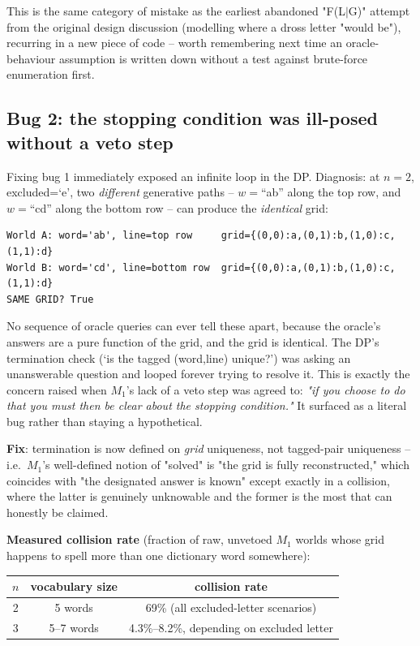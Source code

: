\documentclass[11pt]{article}
\begin{document}
This is the same category of mistake as the earliest abandoned "F(L$\mid$G)"
attempt from the original design discussion (modelling where a dross
letter "would be"), recurring in a new piece of code -- worth remembering
next time an oracle-behaviour assumption is written down without a test
against brute-force enumeration first.

\subsection{Bug 2: the stopping condition was ill-posed without a veto step}

Fixing bug 1 immediately exposed an infinite loop in the DP. Diagnosis: at
$n=2$, excluded=`e', two \emph{different} generative paths --
$w=$``ab'' along the top row, and $w=$``cd'' along the bottom row -- can
produce the \emph{identical} grid:
\begin{lstlisting}
World A: word='ab', line=top row     grid={(0,0):a,(0,1):b,(1,0):c,(1,1):d}
World B: word='cd', line=bottom row  grid={(0,0):a,(0,1):b,(1,0):c,(1,1):d}
SAME GRID? True
\end{lstlisting}
No sequence of oracle queries can ever tell these apart, because the
oracle's answers are a pure function of the grid, and the grid is
identical. The DP's termination check (`is the tagged (word,line) unique?')
was asking an unanswerable question and looped forever trying to resolve
it. This is exactly the concern raised when $M_1$'s lack of a veto step
was agreed to: \emph{"if you choose to do that you must then be clear
about the stopping condition."} It surfaced as a literal bug rather than
staying a hypothetical.

\textbf{Fix}: termination is now defined on \emph{grid} uniqueness, not
tagged-pair uniqueness -- i.e.\ $M_1$'s well-defined notion of "solved" is
"the grid is fully reconstructed," which coincides with "the designated
answer is known" except exactly in a collision, where the latter is
genuinely unknowable and the former is the most that can honestly be
claimed.

\textbf{Measured collision rate} (fraction of raw, unvetoed $M_1$ worlds
whose grid happens to spell more than one dictionary word somewhere):

\begin{center}
\begin{tabular}{ccc}
\toprule
$n$ & vocabulary size & collision rate \\
\midrule
2 & 5 words & 69\% (all excluded-letter scenarios) \\
3 & 5--7 words & 4.3\%--8.2\%, depending on excluded letter \\
\bottomrule
\end{tabular}
\end{center}
\end{document}
